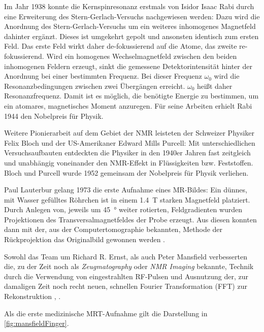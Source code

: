 Im Jahr 1938 konnte die Kernspinresonanz erstmals von Isidor Isaac Rabi durch eine Erweiterung des Stern-Gerlach-Versuchs nachgewiesen werden: Dazu wird die Anordnung des Stern-Gerlach-Versuchs um ein weiteres inhomogenes Magnetfeld dahinter ergänzt. Dieses ist umgekehrt gepolt und ansonsten identisch zum ersten Feld. Das erste Feld wirkt daher de-fokussierend auf die Atome, das zweite re-fokussierend. Wird ein homogenes Wechselmagnetfeld zwischen den beiden inhomogenen Feldern erzeugt, sinkt die gemessene Detektorintensität hinter der Anordnung bei einer bestimmten Frequenz. Bei dieser Frequenz $\omega_0$ wird die Resonanzbedingungen zwischen zwei Übergängen erreicht. $\omega_0$ heißt daher Resonanzfrequenz. Damit ist es möglich, die benötigte Energie zu bestimmen, um ein atomares, magnetisches Moment anzuregen. Für seine Arbeiten erhielt Rabi 1944 den Nobelpreis für Physik. \cite{Rabi1938}

Weitere Pionierarbeit auf dem Gebiet der NMR leisteten der Schweizer Physiker Felix Bloch und der US-Amerikaner Edward Mills Purcell: Mit unterschiedlichen Versuchsaufbauten entdeckten die Physiker in den 1940er Jahren fast zeitgleich und unabhängig voneinander den NMR-Effekt in Flüssigkeiten bzw. Feststoffen. Bloch und Purcell wurde 1952 gemeinsam der Nobelpreis für Physik verliehen.

Paul Lauterbur gelang 1973 die erste Aufnahme eines MR-Bildes: Ein dünnes, mit Wasser gefülltes Röhrchen ist in einem \SI{1.4}{\tesla} starken Magnetfeld platziert. Durch Anlegen von, jeweils um \SI{45}{\degree} weiter rotierten, Feldgradienten wurden Projektionen des Transversalmagnetfeldes der Probe erzeugt. Aus diesen konnten dann mit der, aus der Computertomographie bekannten, Methode der Rückprojektion das Originalbild gewonnen werden \cite{LAUTERBUR1973}.

Sowohl das Team um Richard R. Ernst, als auch Peter Mansfield verbesserten die, zu der Zeit noch als \textit{Zeugmatography} oder \textit{NMR Imaging} bekannte, Technik durch die Verwendung von eingestrahlten RF-Pulsen und Ausnutzung der, zur damaligen Zeit noch recht neuen, schnellen Fourier Transformation (FFT) zur Rekonstruktion \cite{Kumar1975}, \cite{Mansfield1977}.

Als die erste medizinische MRT-Aufnahme gilt die Darstellung in \autoref{fig:mansfieldFinger}.

